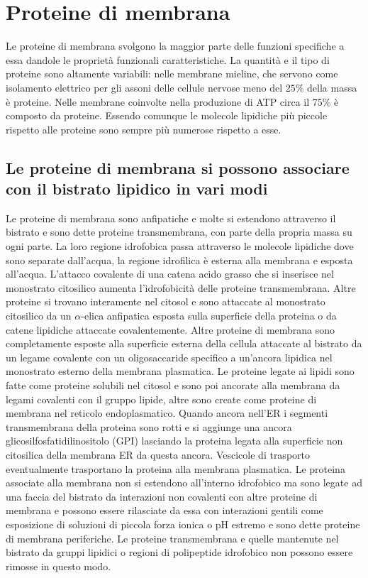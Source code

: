 \section{Proteine di membrana}
Le proteine di membrana svolgono la maggior parte delle funzioni specifiche a essa dandole le propriet\`a funzionali caratteristiche. La quantit\`a e il tipo di proteine sono altamente
variabili: nelle membrane mieline, che servono come isolamento elettrico per gli assoni delle cellule nervose meno del $25\%$ della massa \`e proteine. Nelle membrane coinvolte nella
produzione di ATP circa il $75\%$ \`e composto da proteine. Essendo comunque le molecole lipidiche pi\`u piccole rispetto alle proteine sono sempre pi\`u numerose rispetto a esse. 
\subsection{Le proteine di membrana si possono associare con il bistrato lipidico in vari modi}
Le proteine di membrana sono anfipatiche e molte si estendono attraverso il bistrato e sono dette proteine transmembrana, con parte della propria massa su ogni parte. La loro regione
idrofobica passa attraverso le molecole lipidiche dove sono separate dall'acqua, la regione idrofilica \`e esterna alla membrana e esposta all'acqua. L'attacco covalente di una catena
acido grasso che si inserisce nel monostrato citosilico aumenta l'idrofobicit\`a delle proteine transmembrana. Altre proteine si trovano interamente nel citosol e sono attaccate al
monostrato citosilico da un $\alpha$-elica anfipatica esposta sulla superficie della proteina o da catene lipidiche attaccate covalentemente. Altre proteine di membrana sono 
completamente esposte alla superficie esterna della cellula attaccate al bistrato da un legame covalente con un oligosaccaride specifico a un'ancora lipidica nel monostrato esterno
della membrana plasmatica. Le proteine legate ai lipidi sono fatte come proteine solubili nel citosol e sono poi ancorate alla membrana da legami covalenti con il gruppo lipide, altre
sono create come proteine di membrana nel reticolo endoplasmatico. Quando ancora nell'ER i segmenti transmembrana della proteina sono rotti e si aggiunge una ancora 
glicosilfosfatidilinositolo (GPI) lasciando la proteina legata alla superficie non citosilica della membrana ER da questa ancora. Vescicole di trasporto eventualmente trasportano
la proteina alla membrana plasmatica. Le proteina associate alla membrana non si estendono all'interno idrofobico ma sono legate ad una faccia del bistrato da interazioni non covalenti
con altre proteine di membrana e possono essere rilasciate da essa con interazioni gentili come esposizione di soluzioni di piccola forza ionica o pH estremo e sono dette proteine di 
membrana periferiche. Le proteine transmembrana e quelle mantenute nel bistrato da gruppi lipidici o regioni di polipeptide idrofobico non possono essere rimosse in questo modo.
